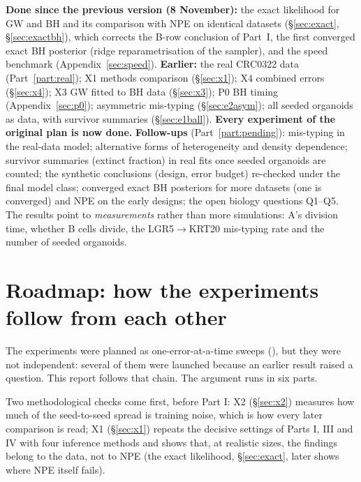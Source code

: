 \documentclass[10pt,a4paper]{article}
\newcommand{\code}[1]{\texttt{\detokenize{#1}}}
\newcommand{\sref}[1]{\S\ref{#1}}
\begin{document}
\textbf{Done since the previous version (8 November):} the exact likelihood for GW and BH and its comparison with NPE on identical datasets (\sref{sec:exact}, \sref{sec:exactbh}), which corrects the B-row conclusion of Part~I, the first converged exact BH posterior (ridge reparametrisation of the sampler), and the speed benchmark (Appendix~\ref{sec:speed}). \textbf{Earlier:} the real CRC0322 data (Part~\ref{part:real}); X1 methods comparison (\S\ref{sec:x1}); X4 combined errors (\S\ref{sec:x4}); X3 GW fitted to BH data (\S\ref{sec:x3}); P0 BH timing (Appendix~\ref{sec:p0}); asymmetric mis-typing (\S\ref{sec:e2asym}); all seeded organoids as data, with survivor summaries (\S\ref{sec:e1ball}). \textbf{Every experiment of the original plan is now done.} \textbf{Follow-ups} (Part~\ref{part:pending}): mis-typing in the real-data model; alternative forms of heterogeneity and density dependence; survivor summaries (extinct fraction) in real fits once seeded organoids are counted; the synthetic conclusions (design, error budget) re-checked under the final model class; converged exact BH posteriors for more datasets (one is converged) and NPE on the early designs; the open biology questions Q1--Q5. The results point to \emph{measurements} rather than more simulations: A's division time, whether B cells divide, the LGR5$\to$KRT20 mis-typing rate and the number of seeded organoids.

\clearpage
{\setcounter{tocdepth}{1}\tableofcontents}
\clearpage

\section{Roadmap: how the experiments follow from each other}\label{sec:roadmap}

The experiments were planned as one-error-at-a-time sweeps (\code{TODO.md}), but they were not independent: several of them were launched because an earlier result raised a question. This report follows that chain. The argument runs in six parts.

Two methodological checks come first, before Part I: X2 (\sref{sec:x2}) measures how much of the seed-to-seed spread is training noise, which is how every later comparison is read; X1 (\sref{sec:x1}) repeats the decisive settings of Parts I, III and IV with four inference methods and shows that, at realistic sizes, the findings belong to the data, not to NPE (the exact likelihood, \sref{sec:exact}, later shows where NPE itself fails).
\end{document}

